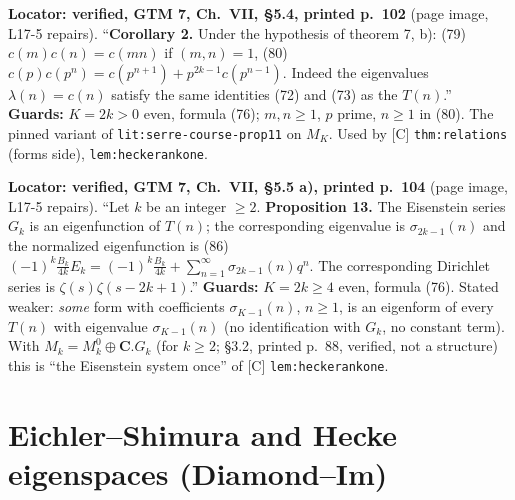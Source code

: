 \begin{hypothesis}\label{lit:serre-course-thm7-cor2}
   \leanok
  \textbf{Locator: verified, GTM 7, Ch.~VII, \S5.4, printed p.~102} (page image, L17-5 repairs). ``\textbf{Corollary 2.}
  Under the hypothesis of theorem 7, b): (79) $c(m)c(n)=c(mn)$ if $(m,n)=1$, (80) $c(p)c(p^n)=c(p^{n+1})+p^{2k-1}c(p^{n-1})$.
  Indeed the eigenvalues $\lambda(n)=c(n)$ satisfy the same identities (72) and (73) as the $T(n)$.''
  \textbf{Guards:} $K=2k>0$ even, formula (76); $m,n\ge1$, $p$ prime, $n\ge1$ in (80). The pinned variant of
  \texttt{lit:serre-course-prop11} on $M_K$. Used by [C] \texttt{thm:relations} (forms side), \texttt{lem:heckerankone}.
\end{hypothesis}

\begin{hypothesis}\label{lit:serre-course-prop13}
   \leanok
  \textbf{Locator: verified, GTM 7, Ch.~VII, \S5.5 a), printed p.~104} (page image, L17-5 repairs). ``Let $k$ be an integer
  $\ge2$. \textbf{Proposition 13.} The Eisenstein series $G_k$ is an eigenfunction of $T(n)$; the corresponding eigenvalue is
  $\sigma_{2k-1}(n)$ and the normalized eigenfunction is (86) $(-1)^k\frac{B_k}{4k}E_k=(-1)^k\frac{B_k}{4k}+\sum_{n=1}^\infty
  \sigma_{2k-1}(n)q^n$. The corresponding Dirichlet series is $\zeta(s)\zeta(s-2k+1)$.''
  \textbf{Guards:} $K=2k\ge4$ even, formula (76). Stated weaker: \emph{some} form with coefficients $\sigma_{K-1}(n)$, $n\ge1$,
  is an eigenform of every $T(n)$ with eigenvalue $\sigma_{K-1}(n)$ (no identification with $G_k$, no constant term). With
  $M_k=M^0_k\oplus\mathbf C.G_k$ (for $k\ge2$; \S3.2, printed p.~88, verified, not a structure) this is ``the Eisenstein
  system once'' of [C] \texttt{lem:heckerankone}.
\end{hypothesis}

\section{Eichler--Shimura and Hecke eigenspaces (Diamond--Im)}

